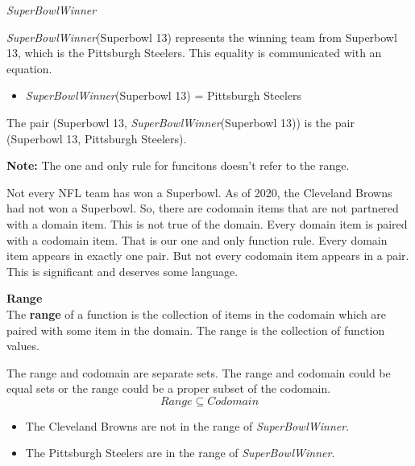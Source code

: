 \documentclass{ximera}
\begin{document}
\begin{example} \textit{SuperBowlWinner}


\textit{SuperBowlWinner}(Superbowl 13) represents the winning team from Superbowl 13, which is the Pittsburgh Steelers.  This equality is communicated with an equation.

\begin{itemize}
\item \textit{SuperBowlWinner}(Superbowl 13) = Pittsburgh Steelers  
\end{itemize}



The pair (Superbowl 13, \textit{SuperBowlWinner}(Superbowl 13)) is the pair (Superbowl 13, Pittsburgh Steelers). \

\end{example}

\textbf{Note:} The one and only rule for funcitons doesn't refer to the range.

Not every NFL team has won a Superbowl. As of 2020, the Cleveland Browns had not won a Superbowl.  So, there are codomain items that are not partnered with a domain item.  This is not true of the domain.  Every domain item is paired with a codomain item.  That is our one and only function rule.  Every domain item appears in exactly one pair.  But not every codomain item appears in a pair.  This is significant and deserves some language.


\begin{definition} \textbf{\textcolor{green!50!black}{Range}} \\

The \textbf{range} of a function is the collection of items in the codomain which are paired with some item in the domain.  The range is the collection of function values.
\end{definition}

The range and codomain are separate sets.  The range and codomain could be equal sets or the range could be a proper subset of the codomain. \\

\[  Range \subseteq Codomain\]

\begin{itemize}
\item The Cleveland Browns are not in the range of \textit{SuperBowlWinner}.  
\item The Pittsburgh Steelers are in the range of \textit{SuperBowlWinner}.
\end{itemize}
\end{document}
